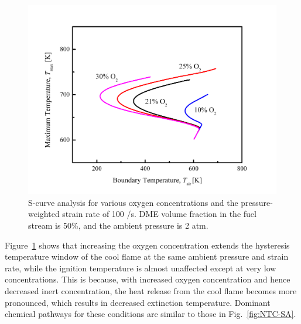\begin{figure}[t]
  \centering
  \scriptsize
  \includegraphics[width=1.0\textwidth]{ch-NTC/eff_O2.png}
  \normalsize
  \caption{S-curve analysis for various oxygen concentrations and the pressure-weighted strain rate of 100 /s.  DME volume fraction in the fuel stream is 50\%, and the ambient pressure is 2 atm.}
  \label{fig:eff_O2}
\end{figure}

Figure~\ref{fig:eff_O2} shows that increasing the oxygen concentration extends the hysteresis temperature window of the cool flame at the same ambient pressure and strain rate, while the ignition temperature is almost unaffected except at very low concentrations.  This is because, with increased oxygen concentration and hence decreased inert concentration, the heat release from the cool flame becomes more pronounced, which results in decreased extinction temperature.  Dominant chemical pathways for these conditions are similar to those in Fig.~\ref{fig:NTC-SA}.

